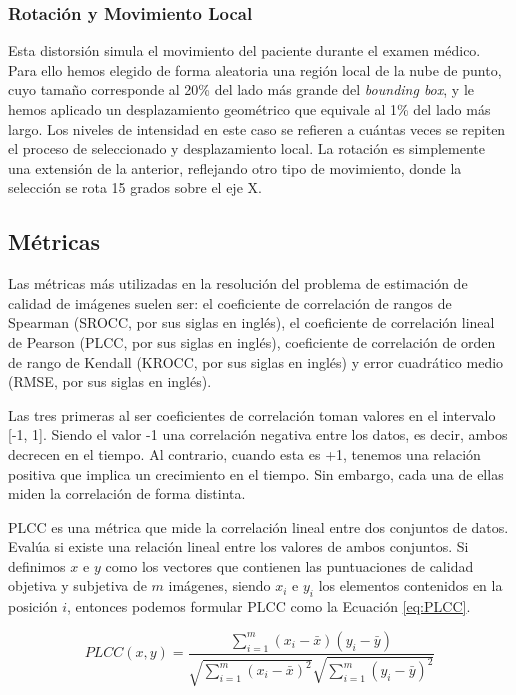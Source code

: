 \subsubsection{Rotación y Movimiento Local}
Esta distorsión simula el movimiento del paciente durante el examen médico. 
Para ello hemos elegido de forma aleatoria una región local de la nube de punto, 
cuyo tamaño corresponde al 20\% del lado más grande del \emph{bounding box}, y 
le hemos aplicado un desplazamiento geométrico que equivale al 1\% del lado 
más largo. Los niveles de intensidad en este caso se refieren a cuántas veces 
se repiten el proceso de seleccionado y desplazamiento local. 
La rotación es simplemente una extensión de la anterior, reflejando otro tipo de movimiento, 
donde la selección se rota 15 grados sobre el eje X.
\subsection{Métricas}
\label{sec:Metricas}
Las métricas más utilizadas en la resolución del problema de estimación de calidad 
de imágenes suelen ser: el coeficiente de correlación de rangos de Spearman (SROCC, 
por sus siglas en inglés), el coeficiente de correlación lineal de Pearson (PLCC, por sus 
siglas en inglés), coeficiente de correlación de orden de rango de Kendall (KROCC, por sus siglas en inglés)
y error cuadrático medio (RMSE, por sus siglas en inglés)\cite{VisualMedicalQualityBook}.

Las tres primeras al ser coeficientes de correlación toman valores en el intervalo 
[-1, 1]. Siendo el valor -1 una correlación negativa entre los datos, es decir,
ambos decrecen en el tiempo. Al contrario, cuando esta es +1, tenemos una relación 
positiva que implica un crecimiento en el tiempo. Sin embargo, cada una de ellas 
miden la correlación de forma distinta. 

PLCC es una métrica que mide la correlación lineal entre dos conjuntos de datos.
Evalúa si existe una relación lineal entre los valores de ambos conjuntos.
Si definimos $x$ e $y$ como los vectores que contienen las puntuaciones de 
calidad objetiva y subjetiva de $m$ imágenes, siendo $x_i$ e $y_i$ 
los elementos contenidos en la posición $i$, entonces podemos formular 
PLCC como la Ecuación \eqref{eq:PLCC}.

\begin{equation}
  PLCC(x,y) = \frac{\sum_{i=1}^m (x_i - \bar x)(y_i - \bar y)}{\sqrt{\sum_{i=1}^m (x_i - \bar x)^2}\sqrt{\sum_{i=1}^m (y_i - \bar y)^2}}
\label{eq:PLCC}
\end{equation}

